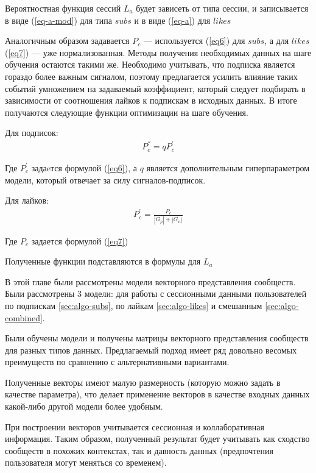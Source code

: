 \documentclass[times,specification,annotation]{itmo-student-thesis}
\begin{document}
Вероятностная функция сессий $L_a$ будет зависеть от типа сессии, и записывается в виде (\ref{eq-a-mod}) для типа $subs$ и в виде (\ref{eq-a}) для $likes$

Аналогичным образом задавается $P_c$ --- используется (\ref{eq6}) для $subs$, а для $likes$ (\ref{eq7}) --- уже нормализованная. Методы получения необходимых данных на шаге обучения остаются такими же. Необходимо учитывать, что подписка является гораздо более важным сигналом, поэтому предлагается усилить влияние таких событий умножением на задаваемый коэффициент, который следует подбирать в зависимости от соотношения лайков к подпискам в исходных данных. В итоге получаются следующие функции оптимизации на шаге обучения.

Для подписок:
\begin{align*}
P^{''}_c = qP^{'}_c
\end{align*}

Где $P^{'}_c$ задаeтся формулой  (\ref{eq6}), а $q$ является дополнительным гиперпараметром модели, который отвечает за силу сигналов-подписок. 

Для лайков:
\begin{align*}
P^{'}_c = \frac{P_c}{|G_p| +|G_n|} 
\end{align*}

Где $P_c$ задается формулой  (\ref{eq7})

Полученные функции подставляются в формулы для $L_a$

\chapterconclusion

В этой главе были рассмотрены модели векторного представления сообществ. Были рассмотрены 3 модели: для работы с сессионными данными пользователей по подпискам \ref{sec:algo-subs}, по лайкам \ref{sec:algo-likes} и смешанным \ref{sec:algo-combined}.

Были обучены модели и получены матрицы векторного представления сообществ для разных типов данных. Предлагаемый подход имеет ряд довольно весомых преимуществ по сравнению с альтернативными вариантами. 

Полученные векторы имеют малую размерность (которую можно задать в качестве параметра), что
делает применение векторов в качестве входных данных какой-либо другой
модели более удобным. 

При построении векторов учитывается сессионная и
коллаборативная информация. Таким образом, полученный результат будет
учитывать как сходство сообществ в похожих контекстах, так и давность данных
(предпочтения пользователя могут меняться со временем). 
\end{document}
